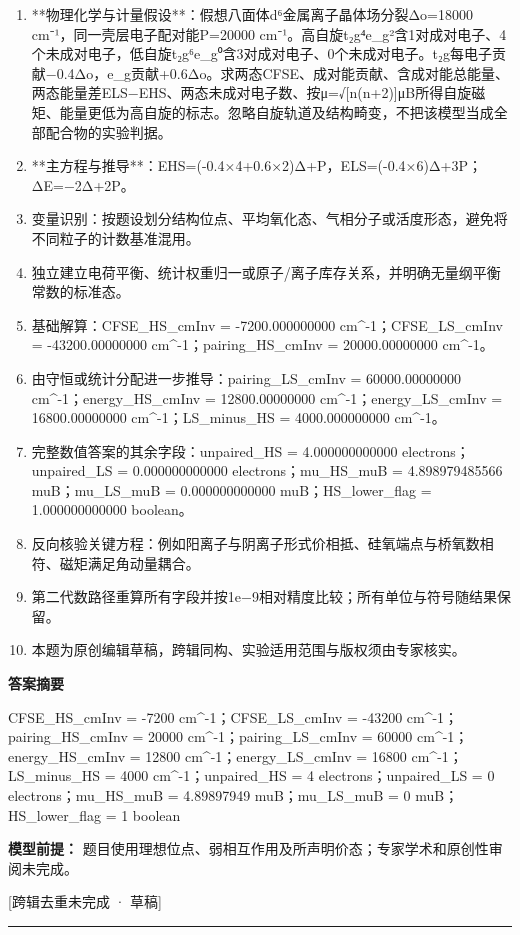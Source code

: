\documentclass[UTF8,11pt,a4paper]{ctexart}
\begin{document}
\begin{enumerate}
\item **物理化学与计量假设**：假想八面体d⁶金属离子晶体场分裂Δo=18000 cm⁻¹，同一壳层电子配对能P=20000 cm⁻¹。高自旋t₂g⁴e\_g²含1对成对电子、4个未成对电子，低自旋t₂g⁶e\_g⁰含3对成对电子、0个未成对电子。t₂g每电子贡献−0.4Δo，e\_g贡献+0.6Δo。求两态CFSE、成对能贡献、含成对能总能量、两态能量差ELS−EHS、两态未成对电子数、按μ=√[n(n+2)]μB所得自旋磁矩、能量更低为高自旋的标志。忽略自旋轨道及结构畸变，不把该模型当成全部配合物的实验判据。
\item **主方程与推导**：EHS=(-0.4×4+0.6×2)Δ+P，ELS=(-0.4×6)Δ+3P；ΔE=−2Δ+2P。
\item 变量识别：按题设划分结构位点、平均氧化态、气相分子或活度形态，避免将不同粒子的计数基准混用。
\item 独立建立电荷平衡、统计权重归一或原子/离子库存关系，并明确无量纲平衡常数的标准态。
\item 基础解算：CFSE\_HS\_cmInv = -7200.000000000 cm\textasciicircum{}-1；CFSE\_LS\_cmInv = -43200.00000000 cm\textasciicircum{}-1；pairing\_HS\_cmInv = 20000.00000000 cm\textasciicircum{}-1。
\item 由守恒或统计分配进一步推导：pairing\_LS\_cmInv = 60000.00000000 cm\textasciicircum{}-1；energy\_HS\_cmInv = 12800.00000000 cm\textasciicircum{}-1；energy\_LS\_cmInv = 16800.00000000 cm\textasciicircum{}-1；LS\_minus\_HS = 4000.000000000 cm\textasciicircum{}-1。
\item 完整数值答案的其余字段：unpaired\_HS = 4.000000000000 electrons；unpaired\_LS = 0.000000000000 electrons；mu\_HS\_muB = 4.898979485566 muB；mu\_LS\_muB = 0.000000000000 muB；HS\_lower\_flag = 1.000000000000 boolean。
\item 反向核验关键方程：例如阳离子与阴离子形式价相抵、硅氧端点与桥氧数相符、磁矩满足角动量耦合。
\item 第二代数路径重算所有字段并按1e−9相对精度比较；所有单位与符号随结果保留。
\item 本题为原创编辑草稿，跨辑同构、实验适用范围与版权须由专家核实。
\end{enumerate}
\noindent\textbf{答案摘要}\par
CFSE\_HS\_cmInv = -7200 cm\textasciicircum{}-1；CFSE\_LS\_cmInv = -43200 cm\textasciicircum{}-1；pairing\_HS\_cmInv = 20000 cm\textasciicircum{}-1；pairing\_LS\_cmInv = 60000 cm\textasciicircum{}-1；energy\_HS\_cmInv = 12800 cm\textasciicircum{}-1；energy\_LS\_cmInv = 16800 cm\textasciicircum{}-1；LS\_minus\_HS = 4000 cm\textasciicircum{}-1；unpaired\_HS = 4 electrons；unpaired\_LS = 0 electrons；mu\_HS\_muB = 4.89897949 muB；mu\_LS\_muB = 0 muB；HS\_lower\_flag = 1 boolean\par
\noindent\textbf{模型前提：}
题目使用理想位点、弱相互作用及所声明价态；专家学术和原创性审阅未完成。\par
\noindent\textcolor{red!65!black}{[跨辑去重未完成 · 草稿]} \par
\medskip\hrule\medskip
{}
\end{document}
